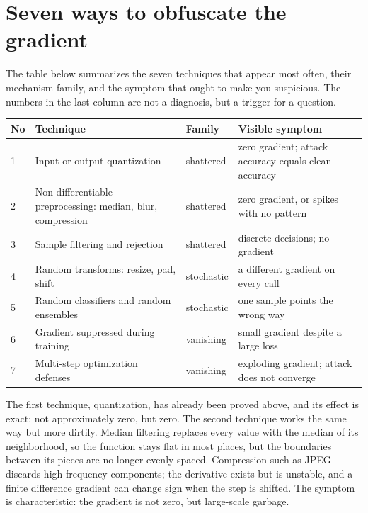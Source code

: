\section{Seven ways to obfuscate the gradient}

The table below summarizes the seven techniques that appear most often, their mechanism family, and
the symptom that ought to make you suspicious. The numbers in the last column are not a diagnosis,
but a trigger for a question.

\begin{center}
\small
\begin{tabular}{@{}p{0.6cm}p{4.6cm}p{2.1cm}p{6.4cm}@{}}
\hline
No & Technique & Family & Visible symptom \\
\hline
1 & Input or output quantization & shattered & zero gradient; attack accuracy equals clean accuracy \\
2 & Non-differentiable preprocessing: median, blur, compression & shattered & zero gradient, or spikes with no pattern \\
3 & Sample filtering and rejection & shattered & discrete decisions; no gradient \\
4 & Random transforms: resize, pad, shift & stochastic & a different gradient on every call \\
5 & Random classifiers and random ensembles & stochastic & one sample points the wrong way \\
6 & Gradient suppressed during training & vanishing & small gradient despite a large loss \\
7 & Multi-step optimization defenses & vanishing & exploding gradient; attack does not converge \\
\hline
\end{tabular}
\end{center}

The first technique, quantization, has already been proved above, and its effect is exact: not
approximately zero, but zero. The second technique works the same way but more dirtily. Median
filtering replaces every value with the median of its neighborhood, so the function stays flat in
most places, but the boundaries between its pieces are no longer evenly spaced. Compression such as
JPEG discards high-frequency components; the derivative exists but is unstable, and a finite
difference gradient can change sign when the step is shifted. The symptom is characteristic: the
gradient is not zero, but large-scale garbage.

